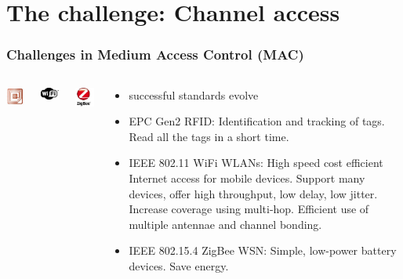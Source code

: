 \documentclass{beamer}
\begin{document}
\section{The challenge: Channel access}
\begin{frame}
  \frametitle{Challenges in Medium Access Control (MAC)}
  \begin{columns}[t]
      \begin{center}
        \includegraphics[width=1.0in]{figures/rfid}
      \end{center}
      \begin{center}
        \includegraphics[width=1.0in]{figures/wifi}
      \end{center}
      \begin{center}
        \includegraphics[width=1.0in]{figures/zigbee}
      \end{center}
      \begin{block}{}
        \begin{itemize}
          \item successful standards evolve
          \item EPC Gen2 RFID: Identification and tracking of tags. Read all the tags in a short time.
          \item IEEE 802.11 WiFi WLANs: High speed cost efficient Internet access for mobile devices. Support many devices, offer high throughput, low delay, low jitter. Increase coverage using multi-hop. Efficient use of multiple antennae and channel bonding.
          \item IEEE 802.15.4 ZigBee WSN: Simple, low-power battery devices. Save energy.
        \end{itemize}
      \end{block}
  \end{columns}
\end{frame}
\end{document}
